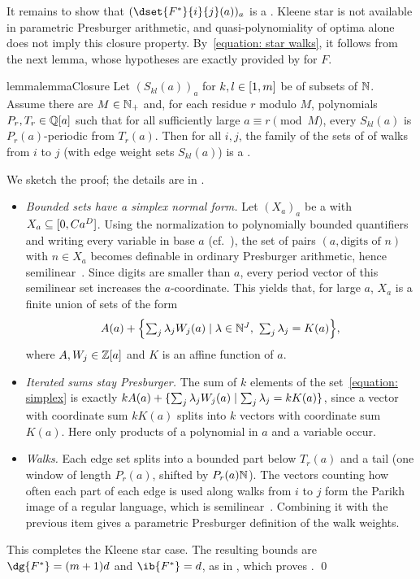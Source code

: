 It remains to show that $(\dset{F^{*}}{i}{j}(a))_{a}$ is a .
Kleene star is not available in parametric Presburger arithmetic, and quasi-polynomiality of optima alone does not imply this closure property.
By~\eqref{equation: star walks}, it follows from the next lemma, whose hypotheses are exactly provided by  for $F$.
\begin{restatable}{lemma}{lemmaClosure}\label{lemma: closure}
    Let $(S_{kl}(a))_{a}$ for $k, l \in [1, m]$ be  of subsets of $\mathbb{N}$.
    Assume there are $M \in \mathbb{N}_{+}$ and, for each residue $r$ modulo $M$, polynomials $P_r, T_r \in \mathbb{Q}[a]$ such that for all sufficiently large $a \equiv r \pmod M$, every $S_{kl}(a)$ is $P_r(a)$-periodic from $T_r(a)$.
    Then for all $i, j$, the family of the sets of  of walks from $i$ to $j$ (with edge weight sets $S_{kl}(a)$) is a .
\end{restatable}
We sketch the proof; the details are in .
\begin{itemize}
    \item \emph{Bounded sets have a simplex normal form.}
          Let $(X_a)_a$ be a  with $X_a \subseteq [0, C a^{D}]$.
          Using the normalization to polynomially bounded quantifiers~\cite[Thm.~3.7]{bogartParametricPresburgerArithmetic2017} and writing every variable in base $a$ (cf.~\cite[Sect.~4.3]{bogartParametricPresburgerArithmetic2017}),
          the set of pairs $(a, \text{digits of } n)$ with $n \in X_a$ becomes definable in ordinary Presburger arithmetic, hence semilinear~\cite{ginsburgSemigroupsPresburgerFormulas1966}.
          Since digits are smaller than $a$, every period vector of this semilinear set increases the $a$-coordinate.
          This yields that, for large $a$, $X_a$ is a finite union of sets of the form
          \begin{equation}
              A(a) + \set*{\textstyle\sum_{j} \lambda_j W_j(a) \mid \lambda \in \nat^{J},\ \sum_{j} \lambda_{j} = K(a)}, \label{equation: simplex}
          \end{equation}
          where $A, W_j \in \mathbb{Z}[a]$ and $K$ is an affine function of $a$.
    \item \emph{Iterated sums stay Presburger.}
          The sum of $k$ elements of the set~\eqref{equation: simplex} is exactly $k A(a) + \{\sum_{j} \lambda_j W_j(a) \mid \sum_{j} \lambda_j = k K(a)\}$, since a vector with coordinate sum $k K(a)$ splits into $k$ vectors with coordinate sum $K(a)$.
          Here only products of a polynomial in $a$ and a variable occur.
    \item \emph{Walks.}
          Each edge set splits into a bounded part below $T_r(a)$ and a tail (one window of length $P_r(a)$, shifted by $P_r(a) \mathbb{N}$).
          The vectors counting how often each part of each edge is used along walks from $i$ to $j$ form the Parikh image of a regular language, which is semilinear~\cite{parikhContextFreeLanguages1966}.
          Combining it with the previous item gives a parametric Presburger definition of the walk weights.
\end{itemize}
This completes the Kleene star case.
The resulting bounds are $\dg{F^{*}} = (m+1) d$ and $\ib{F^{*}} = d$, as in , which proves . \qed
